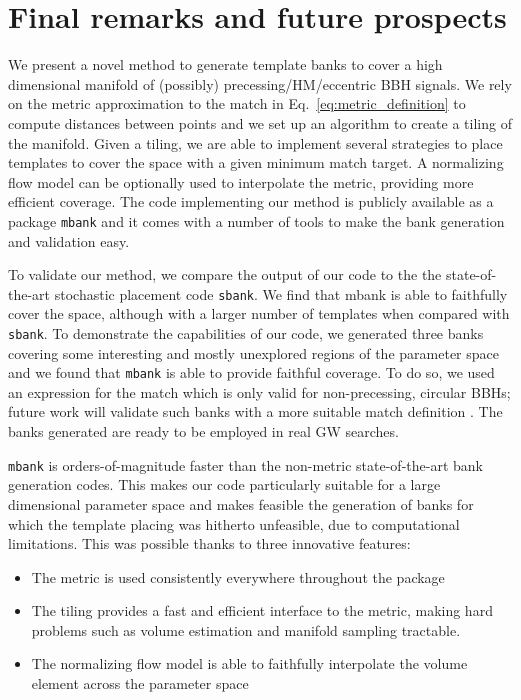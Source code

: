 \documentclass[twocolumn,showpacs,preprintnumbers,nofootinbib,prd,
superscriptaddress,10pt]{revtex4-2}
\begin{document}
\section{Final remarks and future prospects} \label{sec:conclusion}

We present a novel method to generate template banks to cover a high dimensional manifold of (possibly) precessing/HM/eccentric BBH signals.
We rely on the metric approximation to the match in Eq.~\eqref{eq:metric_definition} to compute distances between points and we set up an algorithm to create a tiling of the manifold. Given a tiling, we are able to implement several strategies to place templates to cover the space with a given minimum match target.
A normalizing flow model can be optionally used to interpolate the metric, providing more efficient coverage.
The code implementing our method is publicly available as a package \texttt{mbank} and it comes with a number of tools to make the bank generation and validation easy.

To validate our method, we compare the output of our code to the the state-of-the-art stochastic placement code \texttt{sbank}. We find that mbank is able to faithfully cover the space, although with a larger number of templates when compared with \texttt{sbank}.
To demonstrate the capabilities of our code, we generated three banks covering some interesting and mostly unexplored regions of the parameter space and we found that \texttt{mbank} is able to provide faithful coverage.
To do so, we used an expression for the match which is only valid for non-precessing, circular BBHs; future work will validate such banks with a more suitable match definition \cite{Harry:2017weg}.
The banks generated are ready to be employed in real GW searches.


\texttt{mbank} is orders-of-magnitude faster than the non-metric state-of-the-art bank generation codes.
This makes our code particularly suitable for a large dimensional parameter space and makes feasible the generation of banks for which the template placing was hitherto unfeasible, due to computational limitations.
This was possible thanks to three innovative features:
\begin{itemize}
	\item The metric is used consistently everywhere throughout the package
	\item The tiling provides a fast and efficient interface to the metric, making hard problems such as volume estimation and manifold sampling tractable.
	\item The normalizing flow model is able to faithfully interpolate the volume element across the parameter space
\end{itemize}
\end{document}

